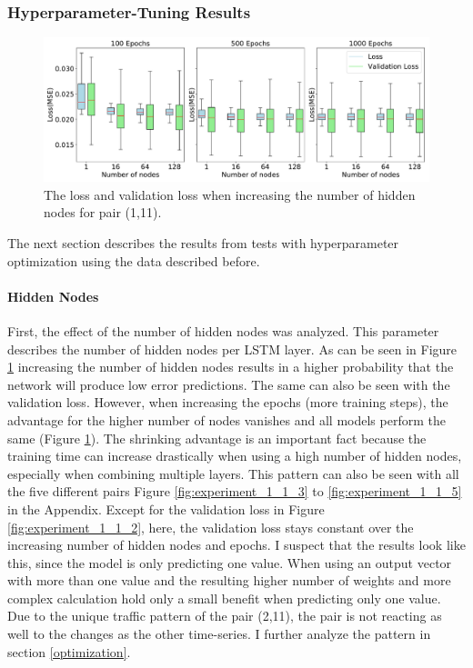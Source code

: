 \subsubsection{Hyperparameter-Tuning Results}
\begin{figure}
	\centering
	\includegraphics[width=1\linewidth]{Pictures/Results/experiment_1_1_1}
	\caption{The loss and validation loss when increasing the number of hidden nodes for pair (1,11).}
	\label{fig:experiment_1}
\end{figure}
The next section describes the results from tests with hyperparameter optimization using the data described before.

\paragraph{Hidden Nodes}
First, the effect of the number of hidden nodes was analyzed.
This parameter describes the number of hidden nodes per LSTM layer.
As can be seen in Figure \ref{fig:experiment_1} increasing the number of hidden nodes results in a higher probability that the network will produce low error predictions.
The same can also be seen with the validation loss.
However, when increasing the epochs (more training steps), the advantage for the higher number of nodes vanishes and all models perform the same (Figure \ref{fig:experiment_1}).
The shrinking advantage is an important fact because the training time can increase drastically when using a high number of hidden nodes, especially when combining multiple layers.
This pattern can also be seen with all the five different pairs Figure \ref{fig:experiment_1_1_3} to \ref{fig:experiment_1_1_5} in the Appendix.
Except for the validation loss in Figure \ref{fig:experiment_1_1_2}, here, the validation loss stays constant over the increasing number of hidden nodes and epochs.
I suspect that the results look like this, since the model is only predicting one value.
When using an output vector with more than one value and the resulting higher number of weights and more complex calculation hold only a small benefit when predicting only one value.
Due to the unique traffic pattern of the pair (2,11), the pair is not reacting as well to the changes as the other time-series.
I further analyze the pattern in section \ref{optimization}.

